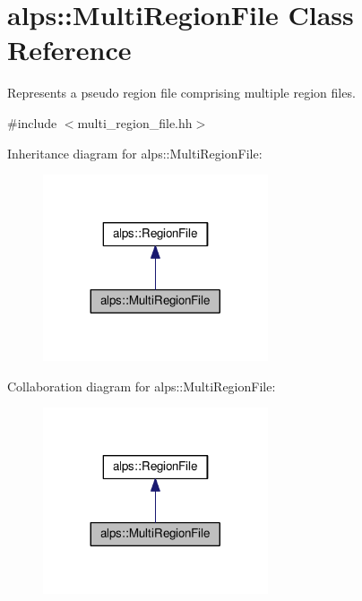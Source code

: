 \hypertarget{classalps_1_1MultiRegionFile}{}\section{alps\+:\+:Multi\+Region\+File Class Reference}
\label{classalps_1_1MultiRegionFile}


Represents a pseudo region file comprising multiple region files.  




{\ttfamily \#include $<$multi\+\_\+region\+\_\+file.\+hh$>$}



Inheritance diagram for alps\+:\+:Multi\+Region\+File\+:
\nopagebreak
\begin{figure}[H]
\begin{center}
\leavevmode
\includegraphics[width=188pt]{classalps_1_1MultiRegionFile__inherit__graph}
\end{center}
\end{figure}


Collaboration diagram for alps\+:\+:Multi\+Region\+File\+:
\nopagebreak
\begin{figure}[H]
\begin{center}
\leavevmode
\includegraphics[width=188pt]{classalps_1_1MultiRegionFile__coll__graph}
\end{center}
\end{figure}
